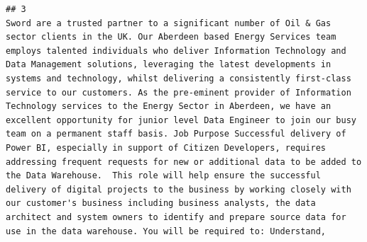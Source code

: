 \documentclass[
]{article}
\begin{document}
\begin{verbatim}
## 3                                                                                                                                                                                                                                                                                                                                                                                                                                                                                                                                                                                                                                                                                                                                                                                                                                                                                                                                                                                                                                                                                                                                                                                                                                                                                                                                                                                                                                                                                                                                                                                                                                                                                                                                                                                                                                                                                                                                                                                                                                                                                                                                                                                                                                                                                                                                    Sword are a trusted partner to a significant number of Oil & Gas sector clients in the UK. Our Aberdeen based Energy Services team employs talented individuals who deliver Information Technology and Data Management solutions, leveraging the latest developments in systems and technology, whilst delivering a consistently first-class service to our customers. As the pre-eminent provider of Information Technology services to the Energy Sector in Aberdeen, we have an excellent opportunity for junior level Data Engineer to join our busy team on a permanent staff basis. Job Purpose Successful delivery of Power BI, especially in support of Citizen Developers, requires addressing frequent requests for new or additional data to be added to the Data Warehouse.  This role will help ensure the successful delivery of digital projects to the business by working closely with our customer's business including business analysts, the data architect and system owners to identify and prepare source data for use in the data warehouse. You will be required to: Understand, 
\end{verbatim}
\end{document}
